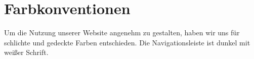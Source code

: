 \chapter{Farbkonventionen}
Um die Nutzung unserer Website angenehm zu gestalten, haben wir uns für schlichte und gedeckte Farben entschieden. Die Navigationsleiste ist dunkel mit weißer Schrift.

